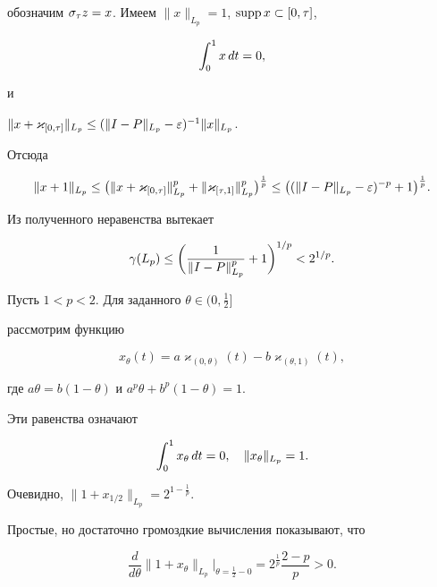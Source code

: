 обозначим $\sig_\tau z = x$. Имеем $\|x\|_{L_p}=1$, $\supp x \sus 


[0, \tau]$, 


$$


\intl{0}{1} x\, dt =0, 


$$


и 


$\|x + \varkappa _{[0, \tau]}\|_{L_p} \le ( \|I-P\|_{L_p} - \eps 


)^{-1} \|x\|_{L_p}$. 


Отсюда 


$$


\|x+1\|_{L_p} \le \big( \|x+ \varkappa _{[0, \tau]} \|_{L_p}^p + 


\|\varkappa_{[\tau, 1]} \|_{L_p}^p\big) ^{\frac 1 p} \le 


\big(( \| I - P \|_{L_p} - \eps) ^{-p} + 1\big) ^{\frac 1 p}. 


$$


Из полученного неравенства вытекает


$$


\gam (L_p) \le \bigg(\frac 1 {\|I - P\|_{L_p}^p} + 1\bigg)^{1/p} 


< 2^{1/p}. 


$$





Пусть $1 < p < 2$. Для заданного $\theta \in (0, \frac 1 2]$ 


рассмотрим функцию


$$


x_\theta (t) = a \varkappa_{(0, \theta)}(t) - b\varkappa_{(\theta, 1)} (t), 


$$


где $a\theta = b (1- \theta )$ и $a^p \theta + b^p (1-\theta) =1$. 


Эти равенства означают


$$


\intl{0}{1} x_\theta \, dt=0, \quad  \|x_\theta \|_{L_p} =1. 


$$


Очевидно, $\|1 + x_{1/2} \|_{L_p} = 2^{1 - \frac 1 p}$. 


Простые, но достаточно громоздкие вычисления показывают, что


$$


\frac {d}{d\theta} \|1 + x_\theta\|_{L_p} \big|_{\theta=\frac 1 2 - 0} 


= 2^{\frac 1 p} \frac {2-p} p >0. 


$$


